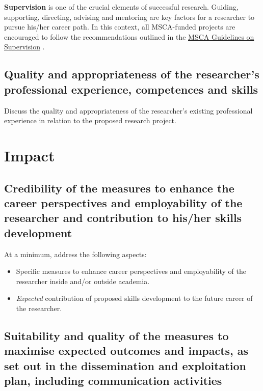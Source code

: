 \documentclass[12pt,draftproposal]{msca-pf}
\begin{document}
\textbf{Supervision} is one of the crucial elements of successful research. Guiding,
supporting, directing, advising and mentoring are key factors for a researcher
to pursue his/her career path. In this context, all MSCA-funded projects are
encouraged to follow the recommendations outlined in the
\href{https://data.europa.eu/doi/10.2766/508311}{MSCA Guidelines on Supervision}
\footnotemark{}.


\subsection{Quality and appropriateness of the researcher's professional
    experience, competences and skills}
\label{ssc:excellence:researcher}

Discuss the quality and appropriateness of the researcher’s existing professional
experience in relation to the proposed research project.

\section{Impact }
\label{sc:impact}

\subsection{Credibility of the measures to enhance the career perspectives
    and employability of the researcher and contribution to his/her skills
    development}
\label{ssc:impact:career}

At a minimum, address the following aspects:

\begin{itemize}
    \item Specific measures to enhance career perspectives and employability of
    the researcher inside and/or outside academia.
    \item \emph{Expected} contribution of proposed skills development to the
    future career of the researcher.
\end{itemize}

\subsection{Suitability and quality of the measures to maximise expected
    outcomes and impacts, as set out in the dissemination and exploitation plan,
    including communication activities }
\label{ssc:impact:outcomes}
\end{document}
